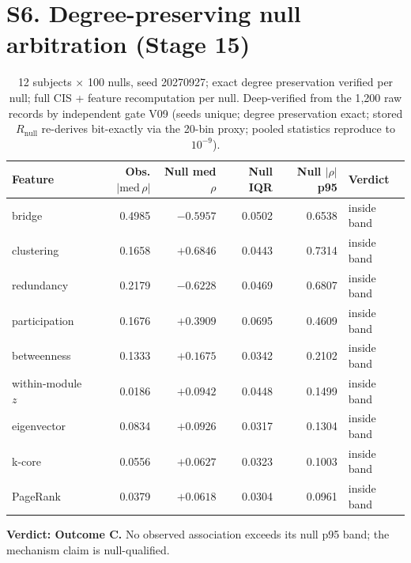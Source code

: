 \documentclass[11pt,a4paper]{article}
\begin{document}
\section{S6. Degree-preserving null arbitration (Stage 15)}
\begin{table}[h]\centering\small
\caption{12 subjects $\times$ 100 nulls, seed 20270927; exact degree
preservation verified per null; full CIS + feature recomputation per null.
Deep-verified from the 1{,}200 raw records by independent gate V09
(seeds unique; degree preservation exact; stored $R_{\mathrm{null}}$
re-derives bit-exactly via the 20-bin proxy; pooled statistics reproduce
to $10^{-9}$).}
\begin{tabular}{lrrrrl}
\toprule
Feature & Obs. $|\mathrm{med}\,\rho|$ & Null med $\rho$ & Null IQR & Null $|\rho|$ p95 & Verdict \\
\midrule
bridge & 0.4985 & $-0.5957$ & 0.0502 & 0.6538 & inside band \\
clustering & 0.1658 & $+0.6846$ & 0.0443 & 0.7314 & inside band \\
redundancy & 0.2179 & $-0.6228$ & 0.0469 & 0.6807 & inside band \\
participation & 0.1676 & $+0.3909$ & 0.0695 & 0.4609 & inside band \\
betweenness & 0.1333 & $+0.1675$ & 0.0342 & 0.2102 & inside band \\
within-module $z$ & 0.0186 & $+0.0942$ & 0.0448 & 0.1499 & inside band \\
eigenvector & 0.0834 & $+0.0926$ & 0.0317 & 0.1304 & inside band \\
k-core & 0.0556 & $+0.0627$ & 0.0323 & 0.1003 & inside band \\
PageRank & 0.0379 & $+0.0618$ & 0.0304 & 0.0961 & inside band \\
\bottomrule
\end{tabular}
\end{table}

\noindent\textbf{Verdict: Outcome C.} No observed association exceeds its
null p95 band; the mechanism claim is null-qualified.
\end{document}
